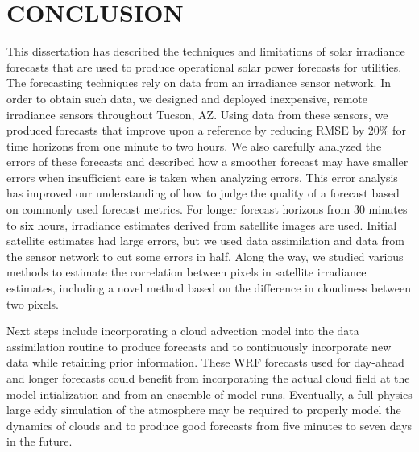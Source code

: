 \chapter{CONCLUSION}
\label{chap:conc}

This dissertation has described the techniques and limitations of
solar irradiance forecasts that are used to produce operational solar
power forecasts for utilities.
The forecasting techniques rely on data from an irradiance sensor
network.
In order to obtain such data, we designed and deployed inexpensive,
remote irradiance sensors throughout Tucson, AZ.
Using data from these sensors, we produced forecasts that improve upon
a reference by reducing RMSE by 20\% for time horizons from one minute
to two hours.
We also carefully analyzed the errors of these forecasts and described
how a smoother forecast may have smaller errors when insufficient care
is taken when analyzing errors.
This error analysis has improved our understanding of how to judge the
quality of a forecast based on commonly used forecast metrics.
For longer forecast horizons from 30 minutes to six hours, irradiance
estimates derived from satellite images are used.
Initial satellite estimates had large errors, but we used data
assimilation and data from the sensor network to cut some errors in
half.
Along the way, we studied various methods to estimate the correlation
between pixels in satellite irradiance estimates, including a novel
method based on the difference in cloudiness between two pixels.

Next steps include incorporating a cloud advection model into the data
assimilation routine to produce forecasts and to continuously
incorporate new data while retaining prior information.
These WRF forecasts used for day-ahead and longer forecasts could
benefit from incorporating the actual cloud field at the model
intialization and from an ensemble of model runs.
Eventually, a full physics large eddy simulation of the atmosphere may
be required to properly model the dynamics of clouds and to produce
good forecasts from five minutes to seven days in the future.



